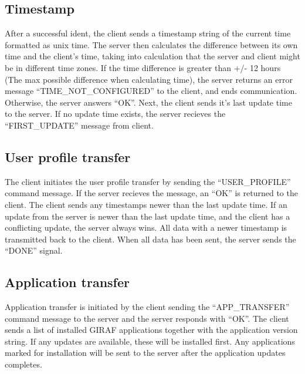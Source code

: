 \subsection{Timestamp}
After a successful ident, the client sends a timestamp string of the current time formatted as unix time. The server then calculates the difference between its own time and the client's time, taking into calculation that the server and client might be in different time zones. If the time difference is greater than +/- 12 hours (The max possible difference when calculating time), the server returns an error message ``TIME\_NOT\_CONFIGURED'' to the client, and ends communication. Otherwise, the server answers ``OK''. 
Next, the client sends it's last update time to the server. If no update time exists, the server recieves the ``FIRST\_UPDATE'' message from client.

\subsection{User profile transfer}
The client initiates the user profile transfer  by sending the ``USER\_PROFILE'' command message. If the server recieves the message, an ``OK'' is returned to the client. The client sends any timestamps newer than the last update time. If an update from the server is newer than the last update time, and the client has a conflicting update, the server always wins. All data with a newer timestamp is transmitted back to the client. When all data has been sent, the server sends the ``DONE'' signal. 

\subsection{Application transfer}
Application transfer is initiated by the client sending the ``APP\_TRANSFER'' command message to the server and the server responds with ``OK''. The client sends a list of installed GIRAF applications together with the application version string. If any updates are available, these will be installed first. Any applications marked for installation will be sent to the server after the application updates completes.   

